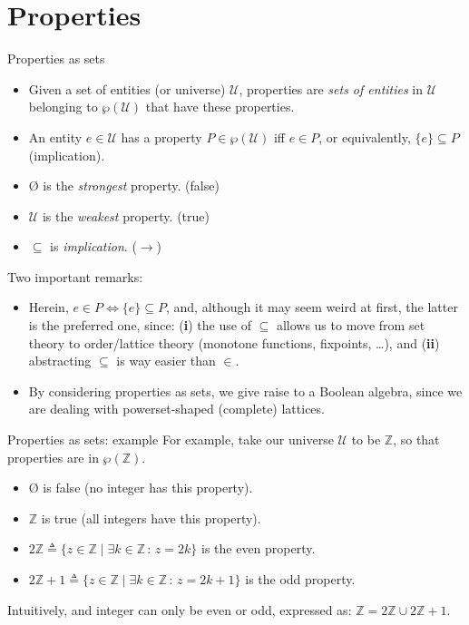\documentclass[aspectratio=169]{beamer}
\begin{document}
\section{Properties}
\begin{frame}{Properties as sets}
  \begin{itemize}
  \item Given a set of entities (or universe) $\mathscr{U}$,
    properties are \emph{sets of entities} in $\mathscr{U}$ belonging
    to $\wp(\mathscr{U})$ that have these properties.
  \pause\item An entity $e \in \mathscr{U}$ has a property
    $P \in \wp(\mathscr{U})$ iff $e \in P$, or equivalently,
    $\{e\} \subseteq P$ (implication).
  \pause\item $\text{\O}$ is the \emph{strongest} property.  \hfill {\small\color{gray}(false)}
  \item $\mathscr{U}$ is the \emph{weakest} property.  \hfill {\small\color{gray}(true)}
  \item $\subseteq$ is \emph{implication}.  \hfill {\small\color{gray}($\to$)}
  \end{itemize}
  \pause Two important remarks:
  \begin{itemize}
  \item Herein, $e \in P \Leftrightarrow \{e\} \subseteq P$, and,
    although it may seem weird at first, the latter is the preferred
    one, since: (\textbf{i}) the use of $\subseteq$ allows us to move
    from set theory to order/lattice theory (monotone functions, fixpoints, \dots), and (\textbf{ii})
    abstracting $\subseteq$ is way easier than $\in$.
  \pause\item By considering properties as sets, we give raise
    to a Boolean algebra, since we are dealing with powerset-shaped
    (complete) lattices.
  \end{itemize}
\end{frame}
%
\begin{frame}{Properties as sets: example}
  For example, take our universe $\mathscr{U}$ to be $\mathbb{Z}$, so
  that properties are in $\wp(\mathbb{Z})$.
  \begin{itemize}
  \item $\text{\O}$ is false (no integer has this property).
  \item $\mathbb{Z}$ is true (all integers have this property).
  \item
    $2\mathbb{Z} \triangleq \{z \in \mathbb{Z}\;\pmb{|}\;\exists k \in
    \mathbb{Z}\,\pmb{:}\,z = 2k\}$ is the even property.
  \item
    $2\mathbb{Z}+1 \triangleq \{z \in \mathbb{Z}\;\pmb{|}\;\exists k
    \in \mathbb{Z}\,\pmb{:}\,z = 2k+1\}$ is the odd property.
  \end{itemize}
  Intuitively, and integer can only be even or odd, expressed as:
  $\mathbb{Z} = 2\mathbb{Z} \cup 2\mathbb{Z}+1$.
\end{frame}
\end{document}
